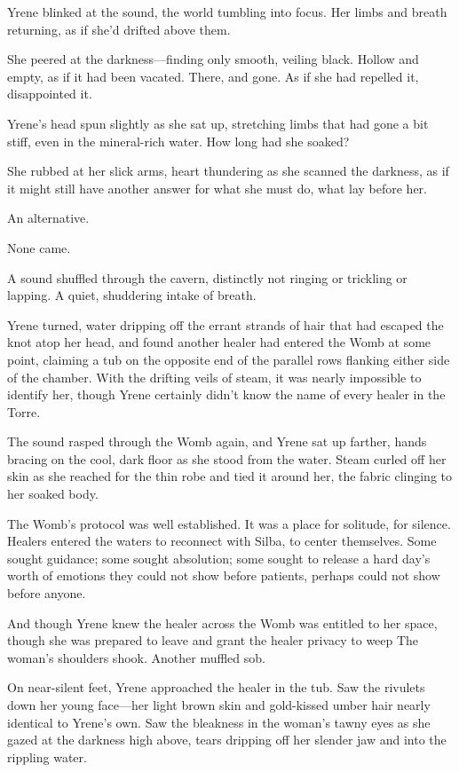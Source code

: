 Yrene blinked at the sound, the world tumbling into focus. Her limbs and breath returning, as if she'd drifted above them.

She peered at the darkness---finding only smooth, veiling black. Hollow and empty, as if it had been vacated. There, and gone. As if she had repelled it, disappointed it.

Yrene's head spun slightly as she sat up, stretching limbs that had gone a bit stiff, even in the mineral-rich water. How long had she soaked?

She rubbed at her slick arms, heart thundering as she scanned the darkness, as if it might still have another answer for what she must do, what lay before her.

An alternative.

None came.

A sound shuffled through the cavern, distinctly not ringing or trickling or lapping. A quiet, shuddering intake of breath.

Yrene turned, water dripping off the errant strands of hair that had escaped the knot atop her head, and found another healer had entered the Womb at some point, claiming a tub on the opposite end of the parallel rows flanking either side of the chamber. With the drifting veils of steam, it was nearly impossible to identify her, though Yrene certainly didn't know the name of every healer in the Torre.

The sound rasped through the Womb again, and Yrene sat up farther, hands bracing on the cool, dark floor as she stood from the water. Steam curled off her skin as she reached for the thin robe and tied it around her, the fabric clinging to her soaked body.

The Womb's protocol was well established. It was a place for solitude, for silence. Healers entered the waters to reconnect with Silba, to center themselves. Some sought guidance; some sought absolution; some sought to release a hard day's worth of emotions they could not show before patients, perhaps could not show before anyone.

And though Yrene knew the healer across the Womb was entitled to her space, though she was prepared to leave and grant the healer privacy to weep  The woman's shoulders shook. Another muffled sob.

On near-silent feet, Yrene approached the healer in the tub. Saw the rivulets down her young face---her light brown skin and gold-kissed umber hair nearly identical to Yrene's own. Saw the bleakness in the woman's tawny eyes as she gazed at the darkness high above, tears dripping off her slender jaw and into the rippling water.

